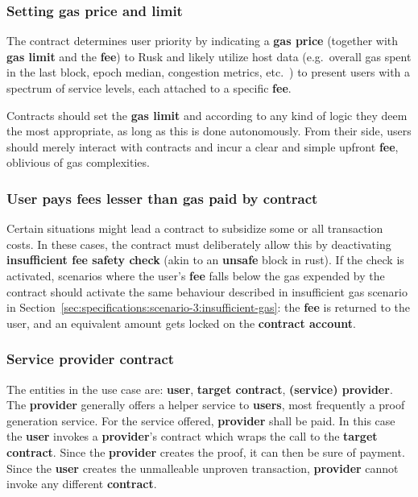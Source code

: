 \documentclass[twocolumn, nofootinbib]{revtex4-2} %
\newcommand{\emphathize}[1]{\textbf{#1}\xspace}
\newcommand{\contract}{\emphathize{contract}}
\newcommand{\contractaccount}{\emphathize{contract account}}
\newcommand{\fee}{\emphathize{fee}}
\newcommand{\gasprice}{\emphathize{gas price}}
\newcommand{\gaslimit}{\emphathize{gas limit}}
\newcommand{\provider}{\emphathize{provider}}
\newcommand{\user}{\emphathize{user}}
\newcommand{\users}{\emphathize{users}}
\begin{document}
    \subsubsection{Setting gas price and limit}\label{sec:specifications:scenario-3:setting-gas-price-and-limit}
    The contract determines user priority by indicating a \gasprice
    (together with \gaslimit and the \fee) to Rusk and likely
    utilize host data (e.g.\ overall gas spent in the last block, epoch median,
    congestion metrics, etc.\ ) to present users with a spectrum of service
    levels, each attached to a specific \fee.

    Contracts should set the \gaslimit and  according
    to any kind of logic they deem the most appropriate, as long as this is done
    autonomously.
    From their side, users should merely interact with contracts and incur a
    clear and simple upfront \fee, oblivious of gas complexities.

    \subsubsection{User pays fees lesser than gas paid by contract}\label{sec:specifications:scenario-3:user-pays-fees-lesser}
    Certain situations might lead a contract to subsidize some or all
    transaction costs.
    In these cases, the contract must deliberately allow this by deactivating
    \textbf{insufficient fee safety check} (akin to an \textbf{unsafe} block in
    rust).
    If the check is activated, scenarios where the user's \fee falls below the
    gas expended by the contract should activate the same behaviour described
    in insufficient gas scenario in Section~\ref{sec:specifications:scenario-3:insufficient-gas}: the
    \fee is returned to the user, and an equivalent amount gets locked
    on the \contractaccount.

    \subsubsection{Service provider contract}\label{sec:specifications:scenario-3:service-provider-contract}
    The entities in the use case are: \user, \textbf{target contract},
    \textbf{(service) provider}.
    The \provider generally offers a helper service to \users,
    most frequently a proof generation service.
    For the service offered, \provider shall be paid.
    In this case the \user invokes a \provider's contract which
    wraps the call to the \textbf{target contract}.
    Since the \provider creates the proof, it can then be sure of
    payment.
    Since the \user creates the unmalleable unproven transaction,
    \provider cannot invoke any different \contract.
\end{document}
